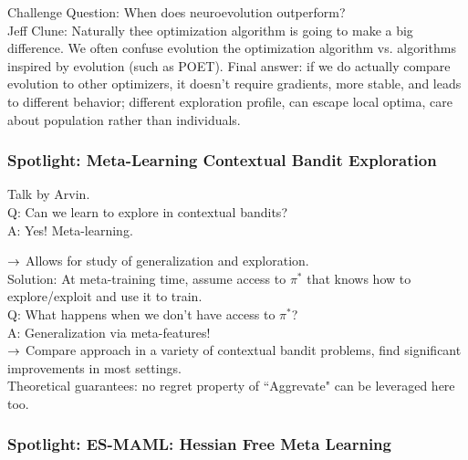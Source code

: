 Challenge Question: When does neuroevolution outperform?\\

Jeff Clune: Naturally thee optimization algorithm is going to make a big difference. We often confuse evolution the optimization algorithm vs. algorithms inspired by evolution (such as POET). Final answer: if we do actually compare evolution to other optimizers, it doesn't require gradients, more stable, and leads to different behavior; different exploration profile, can escape local optima, care about population rather than individuals. \\

\subsubsection{Spotlight: Meta-Learning Contextual Bandit Exploration}

Talk by Arvin. \\

Q: Can we learn to explore in contextual bandits? \\

A: Yes! Meta-learning.


$\rightarrow$ Allows for study of generalization and exploration. \\

Solution: At meta-training time, assume access to $\pi^*$ that knows how to explore/exploit and use it to train. \\

Q: What happens when we don't have access to $\pi^*$? \\

A: Generalization via meta-features!  \\

$\rightarrow$ Compare approach in a variety of contextual bandit problems, find significant improvements in most settings. \\

Theoretical guarantees: no regret property of ``Aggrevate" can be leveraged here too.


\subsubsection{Spotlight: ES-MAML: Hessian Free Meta Learning}

